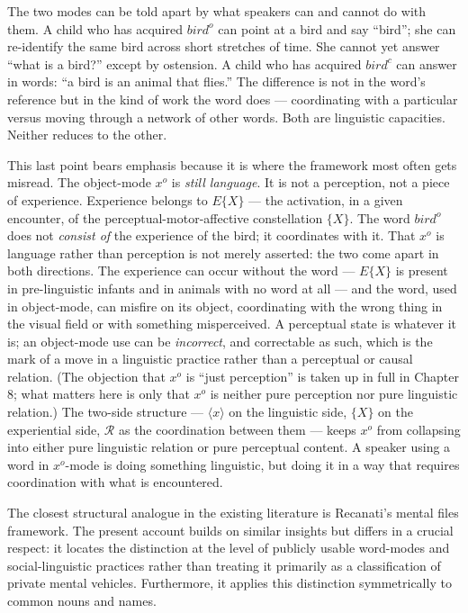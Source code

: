 \documentclass[12pt,a4paper]{article}
\begin{document}
The two modes can be told apart by what speakers can and cannot do with them. A child who has acquired \(bird^o\) can point at a bird and say ``bird''; she can re-identify the same bird across short stretches of time. She cannot yet answer ``what is a bird?'' except by ostension. A child who has acquired \(bird^c\) can answer in words: ``a bird is an animal that flies.'' The difference is not in the word's reference but in the kind of work the word does --- coordinating with a particular versus moving through a network of other words. Both are linguistic capacities. Neither reduces to the other.

This last point bears emphasis because it is where the framework most often gets misread. The object-mode \(x^o\) is \emph{still language}. It is not a perception, not a piece of experience. Experience belongs to \(E\{X\}\) --- the activation, in a given encounter, of the perceptual-motor-affective constellation \(\{X\}\). The word \(bird^o\) does not \emph{consist of} the experience of the bird; it coordinates with it. That \(x^o\) is language rather than perception is not merely asserted: the two come apart in both directions. The experience can occur without the word --- \(E\{X\}\) is present in pre-linguistic infants and in animals with no word at all --- and the word, used in object-mode, can misfire on its object, coordinating with the wrong thing in the visual field or with something misperceived. A perceptual state is whatever it is; an object-mode use can be \emph{incorrect}, and correctable as such, which is the mark of a move in a linguistic practice rather than a perceptual or causal relation. (The objection that \(x^o\) is ``just perception'' is taken up in full in Chapter 8; what matters here is only that \(x^o\) is neither pure perception nor pure linguistic relation.) The two-side structure --- \(\langle x \rangle\) on the linguistic side, \(\{X\}\) on the experiential side, \(\mathcal{R}\) as the coordination between them --- keeps \(x^o\) from collapsing into either pure linguistic relation or pure perceptual content. A speaker using a word in \(x^o\)-mode is doing something linguistic, but doing it in a way that requires coordination with what is encountered.

The closest structural analogue in the existing literature is Recanati's mental files framework. The present account builds on similar insights but differs in a crucial respect: it locates the distinction at the level of publicly usable word-modes and social-linguistic practices rather than treating it primarily as a classification of private mental vehicles. Furthermore, it applies this distinction symmetrically to common nouns and names.
\end{document}
